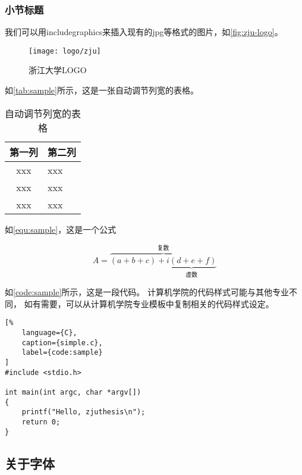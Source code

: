 \subsubsection{小节标题}

\par 我们可以用includegraphics来插入现有的jpg等格式的图片，如\autoref{fig:zju-logo}。

\begin{figure}[ht]
    \centering
    \texttt{[image: logo/zju]}
    \caption{\label{fig:zju-logo}浙江大学LOGO}
\end{figure}

\par 如\autoref{tab:sample}所示，这是一张自动调节列宽的表格。

\begin{table}[ht]
    \caption{\label{tab:sample}自动调节列宽的表格}
    \begin{tabularx}{\linewidth}{|c|X<{\centering}|}
        \hline
        第一列 & 第二列 \\ \hline
        xxx & xxx \\ \hline
        xxx & xxx \\ \hline
        xxx & xxx \\ \hline
    \end{tabularx}
\end{table}

\par 如\autoref{equ:sample}，这是一个公式

\begin{equation}
    \label{equ:sample}
    A=\overbrace{(a+b+c)+\underbrace{i(d+e+f)}_{\text{虚数}}}^{\text{复数}}
\end{equation}

\par 如\autoref{code:sample}所示，这是一段代码。
计算机学院的代码样式可能与其他专业不同，
如有需要，可以从计算机学院专业模板中复制相关的代码样式设定。

\begin{lstlisting}[%
    language={C},
    caption={simple.c},
    label={code:sample}
]
#include <stdio.h>

int main(int argc, char *argv[])
{
    printf("Hello, zjuthesis\n");
    return 0;
}
\end{lstlisting}

\subsection{关于字体}


